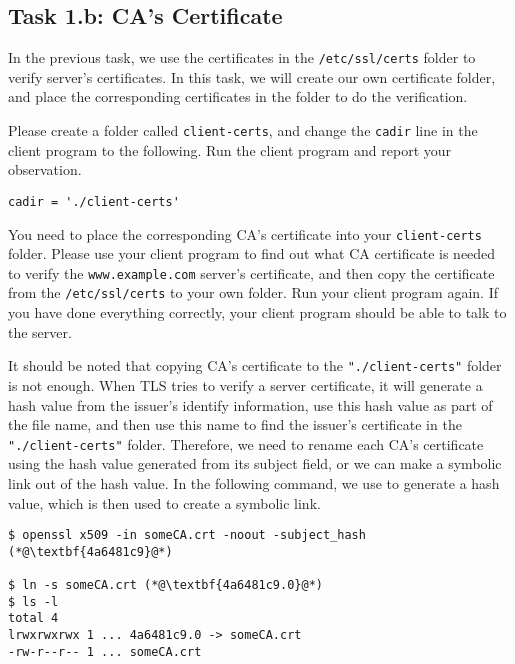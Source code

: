 \subsection{Task 1.b: CA's Certificate}

In the previous task, we use the certificates in
the \texttt{/etc/ssl/certs} folder to verify server's certificates. In this task,
we will create our own certificate folder, and place the corresponding 
certificates in the folder to do the verification.


Please create a folder called \texttt{client-certs}, and change the 
\texttt{cadir} line in the client program to the following. Run the client program
and report your observation.

\begin{lstlisting}
cadir = './client-certs'   
\end{lstlisting}


You need to place the corresponding CA's certificate 
into your \texttt{client-certs} folder.  Please use your client program
to find out what CA certificate is needed to verify
the \texttt{www.example.com} server's certificate, and then copy
the certificate from the \texttt{/etc/ssl/certs} to your 
own folder. Run your client program again. If you have done everything correctly,
your client program should be able to talk to the server.


It should be noted that copying CA's certificate to the \texttt{"./client-certs"} folder is
not enough.  When
TLS tries to verify a server certificate, it will generate a hash value from the
issuer's identify information, use this hash value as part of the file name, and
then use this name to find the issuer's certificate in the \texttt{"./client-certs"} folder.
Therefore, we need to rename each CA's certificate using the hash value generated from its
subject field, or we can make a symbolic link out of the hash value. In the following command,
we use \openssl to generate a hash value, which is then used to create a symbolic link.

\begin{lstlisting}
$ openssl x509 -in someCA.crt -noout -subject_hash
(*@\textbf{4a6481c9}@*)

$ ln -s someCA.crt (*@\textbf{4a6481c9.0}@*)
$ ls -l
total 4
lrwxrwxrwx 1 ... 4a6481c9.0 -> someCA.crt
-rw-r--r-- 1 ... someCA.crt
\end{lstlisting}


